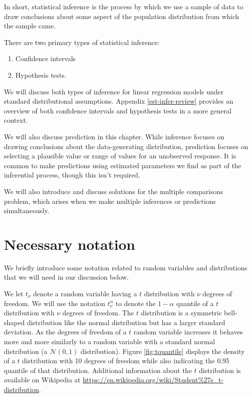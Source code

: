 \documentclass[
]{book}
\providecommand{\tightlist}{%
  \setlength{\itemsep}{0pt}\setlength{\parskip}{0pt}}
\theoremstyle{definition}
\theoremstyle{definition}
\theoremstyle{definition}
\theoremstyle{definition}
\theoremstyle{remark}
\begin{document}
In short, statistical inference is the process by which we
use a sample of data to draw conclusions about some aspect
of the population distribution from which the sample came.

There are two primary types of statistical inference:

\begin{enumerate}
\def\labelenumi{\arabic{enumi}.}
\tightlist
\item
  Confidence intervals
\item
  Hypothesis tests.
\end{enumerate}

We will discuss both types of inference for linear regression models under standard distributional assumptions. Appendix \ref{est-infer-review} provides an overview of both confidence intervals and hypothesis tests in a more general context.

We will also discuss prediction in this chapter. While inference focuses on drawing conclusions about the data-generating distribution, prediction focuses on selecting a plausible value or range of values for an unobserved response. It is common to make predictions using estimated parameters we find as part of the inferential process, though this isn't required.

We will also introduce and discuss solutions for the multiple
comparisons problem, which arises when we make multiple inferences or
predictions simultaneously.

\hypertarget{necessary-notation}{%
\section{Necessary notation}\label{necessary-notation}}

We briefly introduce some notation related to random variables and
distributions that we will need in our discussion below.

We let \(t_{\nu}\) denote a random variable having a \(t\) distribution with
\(\nu\) degrees of freedom. We will use the notation \(t_{\nu}^{\alpha}\) to
denote the \(1-\alpha\) quantile of a \(t\) distribution with \(\nu\) degrees
of freedom. The \(t\) distribution is a symmetric bell-shaped distribution
like the normal distribution but has a larger standard deviation. As the
degrees of freedom of a \(t\) random variable increases it behaves more
and more similarly to a random variable with a standard normal
distribution (a \(\mathcal{N}(0,1)\) distribution). Figure \ref{fig:tquantile} displays the density of a \(t\) distribution with 10 degrees of freedom while also indicating the 0.95 quantile of that distribution. Additional information about the \(t\) distribution is available on Wikipedia at
\url{https://en.wikipedia.org/wiki/Student\%27s_t-distribution}.
\end{document}
